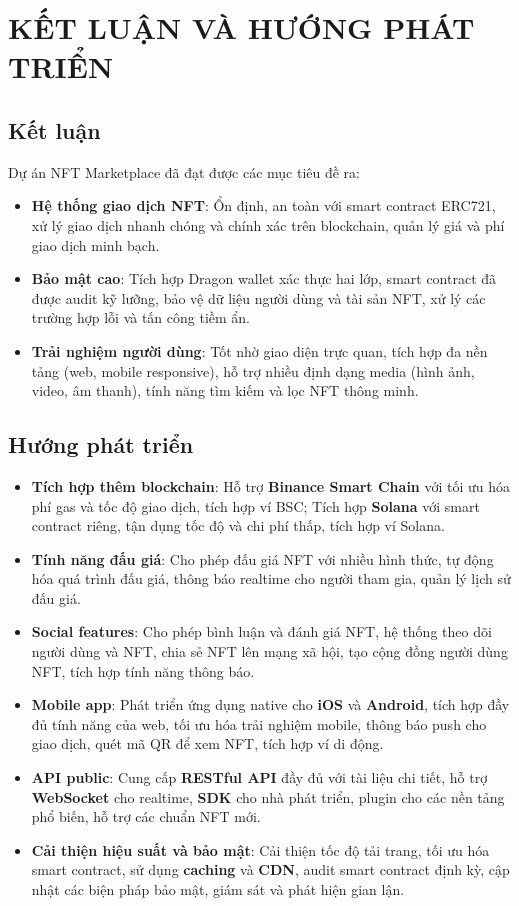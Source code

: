 \documentclass[a4paper,12pt]{article}
\begin{document}
\chapter{KẾT LUẬN VÀ HƯỚNG PHÁT TRIỂN}

\section{Kết luận}

\noindent Dự án NFT Marketplace đã đạt được các mục tiêu đề ra:

\begin{itemize}
    \item \textbf{Hệ thống giao dịch NFT}: Ổn định, an toàn với smart contract ERC721, xử lý giao dịch nhanh chóng và chính xác trên blockchain, quản lý giá và phí giao dịch minh bạch.
    \item \textbf{Bảo mật cao}: Tích hợp Dragon wallet xác thực hai lớp, smart contract đã được audit kỹ lưỡng, bảo vệ dữ liệu người dùng và tài sản NFT, xử lý các trường hợp lỗi và tấn công tiềm ẩn.
    \item \textbf{Trải nghiệm người dùng}: Tốt nhờ giao diện trực quan, tích hợp đa nền tảng (web, mobile responsive), hỗ trợ nhiều định dạng media (hình ảnh, video, âm thanh), tính năng tìm kiếm và lọc NFT thông minh.
\end{itemize}

\section{Hướng phát triển}

\begin{itemize}
    \item \textbf{Tích hợp thêm blockchain}: Hỗ trợ \textbf{Binance Smart Chain} với tối ưu hóa phí gas và tốc độ giao dịch, tích hợp ví BSC; Tích hợp \textbf{Solana} với smart contract riêng, tận dụng tốc độ và chi phí thấp, tích hợp ví Solana.
    \item \textbf{Tính năng đấu giá}: Cho phép đấu giá NFT với nhiều hình thức, tự động hóa quá trình đấu giá, thông báo realtime cho người tham gia, quản lý lịch sử đấu giá.
    \item \textbf{Social features}: Cho phép bình luận và đánh giá NFT, hệ thống theo dõi người dùng và NFT, chia sẻ NFT lên mạng xã hội, tạo cộng đồng người dùng NFT, tích hợp tính năng thông báo.
    \item \textbf{Mobile app}: Phát triển ứng dụng native cho \textbf{iOS} và \textbf{Android}, tích hợp đầy đủ tính năng của web, tối ưu hóa trải nghiệm mobile, thông báo push cho giao dịch, quét mã QR để xem NFT, tích hợp ví di động.
    \item \textbf{API public}: Cung cấp \textbf{RESTful API} đầy đủ với tài liệu chi tiết, hỗ trợ \textbf{WebSocket} cho realtime, \textbf{SDK} cho nhà phát triển, plugin cho các nền tảng phổ biến, hỗ trợ các chuẩn NFT mới.
    \item \textbf{Cải thiện hiệu suất và bảo mật}: Cải thiện tốc độ tải trang, tối ưu hóa smart contract, sử dụng \textbf{caching} và \textbf{CDN}, audit smart contract định kỳ, cập nhật các biện pháp bảo mật, giám sát và phát hiện gian lận.
\end{itemize}
\end{document}
